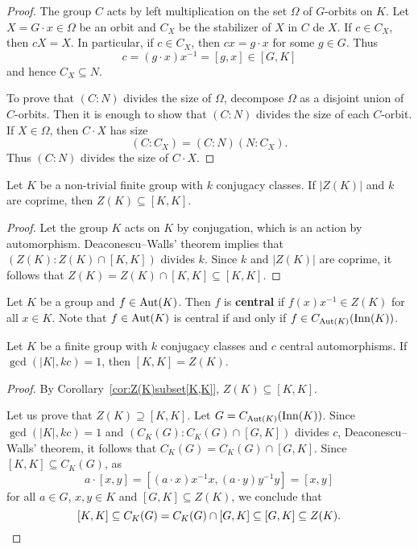 \begin{proof}
  The group $C$ acts by left multiplication on the set $\Omega$ of
  $G$-orbits on $K$. Let $X=G\cdot x\in\Omega$ be an orbit and $C_X$ be the stabilizer of $X$ 
  in $C$ de $X$. If $c\in C_X$, then $cX=X$. In particular, if $c\in C_X$, then 
  $cx=g\cdot x$ for some $g\in G$. Thus 
  \[
  c=(g\cdot
  x)x^{-1}=[g,x]\in [G,K]
  \]
  and hence $C_X\subseteq N$.

  To prove that $(C:N)$ divides the size of $\Omega$, 
  decompose $\Omega$ as a disjoint union of $C$-orbits. Then 
  it is enough to show that 
  $(C:N)$ divides the size of each $C$-orbit. If $X\in\Omega$, then $C\cdot
  X$ has size 
  \[
	(C:C_X)=(C:N)(N:C_X).
  \]
  Thus $(C:N)$ divides the size of $C\cdot X$.
\end{proof}

\begin{corollary}
  \label{cor:Z(K)subset[K,K]}
  Let $K$ be a non-trivial finite group with $k$ conjugacy classes. If 
  $|Z(K)|$ and $k$ are coprime, then  
  $Z(K)\subseteq[K,K]$.
\end{corollary}

\begin{proof}
	Let the group $K$ acts on $K$ by conjugation, which is an action by automorphism. 
	Deaconescu--Walls' theorem implies that 
	$(Z(K):Z(K)\cap [K,K])$ divides $k$. Since $k$ and $|Z(K)|$ are coprime, it follows that 
	$Z(K)=Z(K)\cap [K,K]\subseteq [K,K]$. 
\end{proof}

Let $K$ be a group and $f\in\operatorname{Aut}(K)$. Then $f$ is \textbf{central} if
$f(x)x^{-1}\in Z(K)$ for all $x\in K$. Note that $f\in\operatorname{Aut}(K)$ is central
if and only if $f\in C_{\operatorname{Aut}(K)}(\mathrm{Inn}(K))$.

\begin{corollary}
	Let $K$ be a finite group with $k$ conjugacy classes and $c$ central automorphisms. 
	If $\gcd(|K|,kc)=1$, then $[K,K]=Z(K)$.
\end{corollary}

\begin{proof}
	By Corollary~\ref{cor:Z(K)subset[K,K]}, $Z(K)\subseteq [K,K]$. 
	
	Let us prove
	that $Z(K)\supseteq [K,K]$. Let 
	$G=C_{\operatorname{Aut}(K)}(\mathrm{Inn}(K))$. Since $\gcd(|K|, kc)=1$ and 
	$(C_K(G):C_K(G)\cap [G,K])$ divides $c$, 
	Deaconescu--Walls' theorem, it follows that $C_K(G)=C_K(G)\cap [G,K]$. 
	Since $[K,K]\subseteq C_K(G)$, as 
	\[
		a\cdot [x,y]=[(a\cdot x)x^{-1}x,(a\cdot y)y^{-1}y]=[x,y]
	\]
	for all $a\in G$, $x,y\in K$ and $[G,K]\subseteq Z(K)$, we conclude that 
	\[
	[K,K]\subseteq C_K(G)=C_K(G)\cap [G,K]\subseteq [G,K]\subseteq Z(K).\qedhere 
	\]
\end{proof}

